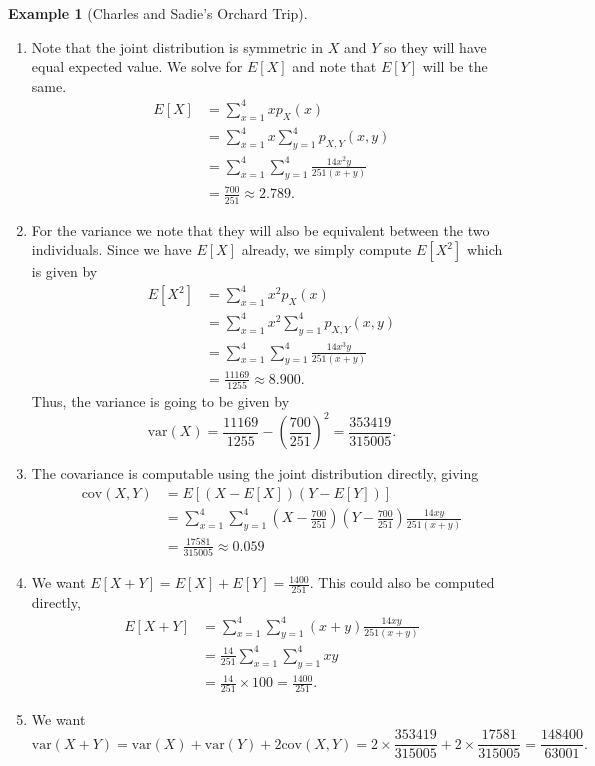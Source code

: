 \documentclass[
  letterpaper,
  DIV=11,
  numbers=noendperiod]{scrreprt}
\providecommand{\tightlist}{%
  \setlength{\itemsep}{0pt}\setlength{\parskip}{0pt}}\usepackage{longtable,booktabs,array}
\theoremstyle{definition}
\theoremstyle{definition}
\newtheorem{example}{Example}[chapter]
\theoremstyle{definition}
\theoremstyle{remark}
\begin{document}
\begin{example}[Charles and Sadie's Orchard
Trip]
\begin{tcolorbox}[enhanced jigsaw, colback=white, colframe=quarto-callout-color-frame, arc=.35mm, leftrule=.75mm, rightrule=.15mm, opacityback=0, breakable, bottomrule=.15mm, left=2mm, toprule=.15mm]
\begin{enumerate}
\def\labelenumi{\alph{enumi}.}
\tightlist
\item
  Note that the joint distribution is symmetric in \(X\) and \(Y\) so
  they will have equal expected value. We solve for \(E[X]\) and note
  that \(E[Y]\) will be the same. \begin{align*}
  E[X] &= \sum_{x=1}^4 xp_X(x) \\
  &= \sum_{x=1}^4 x\sum_{y=1}^4 p_{X,Y}(x, y) \\
  &= \sum_{x=1}^4\sum_{y=1}^4 \frac{14x^2y}{251(x + y)} \\
  &= \frac{700}{251} \approx 2.789.
  \end{align*}
\item
  For the variance we note that they will also be equivalent between the
  two individuals. Since we have \(E[X]\) already, we simply compute
  \(E[X^2]\) which is given by \begin{align*}
  E[X^2] &= \sum_{x=1}^4 x^2p_X(x) \\
  &= \sum_{x=1}^4 x^2\sum_{y=1}^4 p_{X,Y}(x, y) \\
  &= \sum_{x=1}^4\sum_{y=1}^4 \frac{14x^3y}{251(x + y)} \\
  &= \frac{11169}{1255} \approx 8.900.
  \end{align*} Thus, the variance is going to be given by
  \[\text{var}(X) = \frac{11169}{1255} - \left(\frac{700}{251}\right)^2 = \frac{353419}{315005}.\]
\item
  The covariance is computable using the joint distribution directly,
  giving \begin{align*}
  \text{cov}(X,Y) &= E[(X-E[X])(Y-E[Y])] \\
  &= \sum_{x=1}^4\sum_{y=1}^4 \left(X-\frac{700}{251}\right)\left(Y-\frac{700}{251}\right)\frac{14xy}{251(x + y)} \\
  &= \frac{17581}{315005} \approx 0.059
  \end{align*}
\item
  We want \(E[X+Y] = E[X] + E[Y] = \frac{1400}{251}\). This could also
  be computed directly, \begin{align*}
  E[X+Y] &= \sum_{x=1}^4\sum_{y=1}^4 (x+y)\frac{14xy}{251(x + y)} \\
  &= \frac{14}{251}\sum_{x=1}^4\sum_{y=1}^{4}xy \\
  &= \frac{14}{251}\times 100 = \frac{1400}{251}.
  \end{align*}
\item
  We want
  \[\text{var}(X+Y) = \text{var}(X) + \text{var}(Y) + 2\text{cov}(X,Y) = 2\times\frac{353419}{315005} + 2\times\frac{17581}{315005} = \frac{148400}{63001}.\]
\end{enumerate}

\end{tcolorbox}

\end{example}
\end{document}
